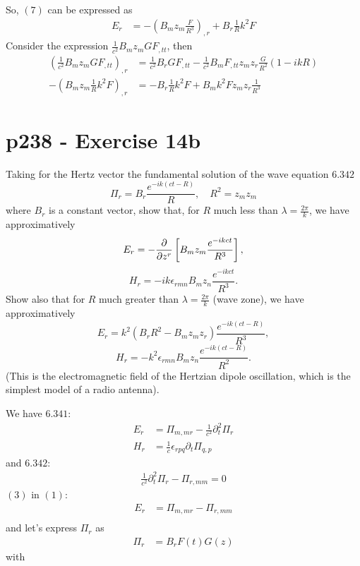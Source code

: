 So, $(7)$ can be expressed as
\begin{align}
E_r&= -\left(B_mz_m\frac{F}{R^3}\right)_{,r}+B_r\frac{1}{R}k^2F
\end{align}
Consider the expression $\frac{1}{c^2}B_mz_mGF_{,tt}$, then
\begin{align}
\left(\frac{1}{c^2}B_mz_mGF_{,tt}\right)_{,r}&= \frac{1}{c^2}B_rGF_{,tt}-\frac{1}{c^2}B_mF_{,tt}z_mz_r\frac{G}{R^2}\left(1-ikR\right)\\
-\left(B_mz_m\frac{1}{R}k^2F\right)_{,r}&= -B_r\frac{1}{R}k^2F+B_mk^2Fz_mz_r\frac{1}{R^3}
\end{align}



\section{p238 - Exercise 14b}
\begin{tcolorbox}
Taking for the Hertz vector the fundamental solution of the wave equation $\mathbf{6.342}$
$$\Pi_r=B_r\frac{e^{-ik\left(ct-R\right)}}{R},\quad R^2=z_mz_m$$
where $B_r$ is a constant vector, show that, for $R$ much less than $\lambda=\frac{2\pi}{k}$, we have approximatively
$$E_r= -\pdv{}{z^r}\left[B_mz_m\frac{e^{-ikct}}{R^3}\right],$$
$$H_r= -ik\epsilon_{rmn}B_mz_n\frac{e^{-ikct}}{R^3}.$$
Show also that for $R$ much greater than $\lambda=\frac{2\pi}{k}$ (wave zone), we have approximatively
$$E_r= k^2\left(B_rR^2-B_mz_mz_r\right)\frac{e^{-ik(ct-R)}}{R^3},$$
$$H_r= -k^2\epsilon_{rmn}B_mz_n\frac{e^{-ik(ct-R)}}{R^2}.$$
(This is the electromagnetic field of the Hertzian dipole oscillation, which is the simplest model of a radio antenna).
\end{tcolorbox}
We have $\mathbf{6.341}$:
\begin{align}
E_r&= \Pi_{m,mr}-\frac{1}{c^2}\partial^2_t\Pi_r\\
H_r&= \frac{1}{c}\epsilon_{rpq}\partial_t\Pi_{q,p}
\end{align}
and $\mathbf{6.342}$:
\begin{align}
\frac{1}{c^2}\partial^2_t\Pi_r-\Pi_{r,mm}=0
\end{align}
$(3)$ in $(1)$:
\begin{align}
E_r&= \Pi_{m,mr}-\Pi_{r,mm}\\
\end{align}
and let's express $\Pi_r$ as 
\begin{align}
\Pi_r&= B_rF(t)G(z)
\end{align}
with
\\
